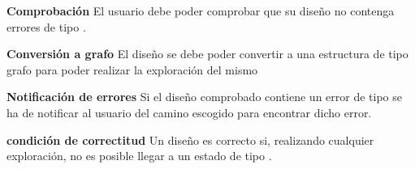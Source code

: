 	\item \textbf{Comprobación}\newline
		El usuario debe poder comprobar que su diseño no contenga errores de tipo \textit{}.
		\begin{functional}
			\item \textbf{Conversión a grafo}\newline
				El diseño se debe poder convertir a una estructura de tipo grafo para poder realizar la exploración del mismo
			\item \textbf{Notificación de errores}\newline
				Si el diseño comprobado contiene un error de tipo \textit{} se ha de notificar al usuario del camino escogido para encontrar dicho error.
			\item \textbf{condición de correctitud}\newline
				Un diseño es correcto si, realizando cualquier exploración, no es posible llegar a un estado de tipo \textit{}.
		\end{functional}
